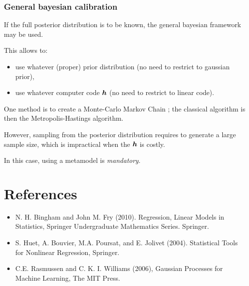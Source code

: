 \documentclass{beamer}
\begin{document}
\begin{frame}
\frametitle{General bayesian calibration}

If the full posterior distribution is to be known, the 
general bayesian framework may be used. 

This allows to:
\begin{itemize}
\item use whatever (proper) prior distribution (no need to restrict to gaussian 
prior),
\item use whatever computer code $\boldsymbol{h}$ (no need to restrict to linear 
code).
\end{itemize}

One method is to create a Monte-Carlo Markov Chain ; the classical algorithm is then the 
Metropolis-Hastings algorithm. 

However, sampling from the posterior distribution 
requires to generate a large sample size, which is impractical 
when the $\boldsymbol{h}$ is costly. 

In this case, using a metamodel is \emph{mandatory}. 

\end{frame}

\section{References}

\begin{itemize}
\item  N. H. Bingham and John M. Fry (2010). Regression, Linear Models in Statistics, Springer Undergraduate Mathematics Series. Springer.
\item S. Huet, A. Bouvier, M.A. Poursat, and E. Jolivet (2004). Statistical Tools for Nonlinear Regression, Springer.
\item C.E. Rasmussen and C. K. I. Williams (2006), Gaussian Processes for Machine Learning, The MIT Press.
\end{itemize}
\end{document}
